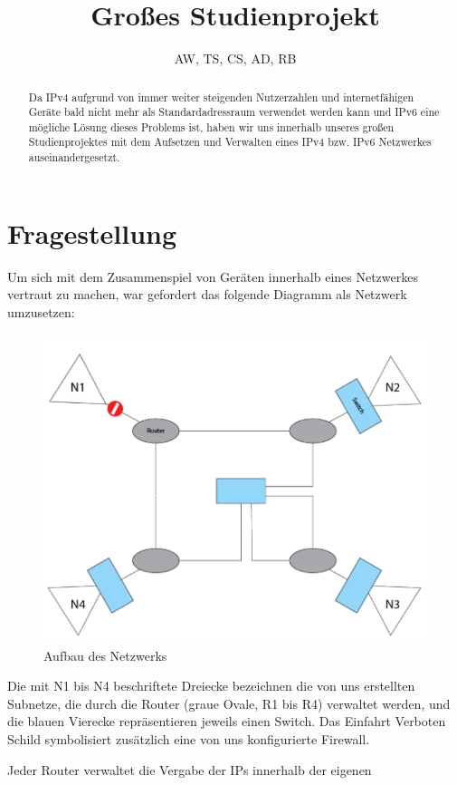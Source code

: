 \documentclass[11pt,a4paper]{article}
\author{AW, TS, CS, AD, RB}
\title{Großes Studienprojekt}
\begin{document}
\maketitle
\begin{abstract}
  Da IPv4 aufgrund von immer weiter steigenden Nutzerzahlen
  und internetfähigen Geräte bald nicht mehr als
  Standardadressraum verwendet werden kann und IPv6 eine
  mögliche Lösung dieses Problems ist, haben wir uns innerhalb
  unseres großen Studienprojektes mit dem Aufsetzen und
  Verwalten eines IPv4 bzw. IPv6 Netzwerkes
  auseinandergesetzt.
\end{abstract}
\section{Fragestellung}
Um sich mit dem Zusammenspiel von Geräten innerhalb eines
Netzwerkes vertraut zu machen, war gefordert das folgende
Diagramm als Netzwerk umzusetzen:
\begin{figure}[ht]
  \includegraphics[width=\linewidth]{./network_topography.png}
  \centering
  \caption{Aufbau des Netzwerks}
\end{figure}
\par
Die mit N1 bis N4 beschriftete Dreiecke bezeichnen die von uns
erstellten Subnetze, die durch die Router (graue Ovale, R1 bis R4)
verwaltet werden, und die blauen Vierecke repräsentieren jeweils einen
Switch. Das \glqq Einfahrt Verboten\grqq~ Schild symbolisiert
zusätzlich eine von uns konfigurierte Firewall.
\par
Jeder Router verwaltet die Vergabe der IPs innerhalb der eigenen
\end{document}
